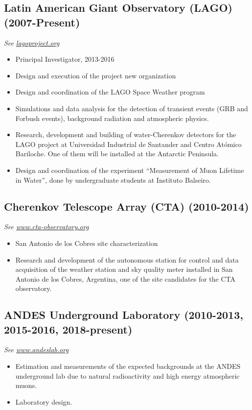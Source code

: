 \subsection*{Latin American Giant Observatory (LAGO) (2007-Present)}
{\small{\textit{See \href{http://lagoproject.org}{lagoproject.org}}}}
\begin{itemize}
\item Principal Investigator, 2013-2016
\item Design and execution of the project new organization
\item Design and coordination of the LAGO Space Weather program 
\item Simulations and data analysis for the detection of transient events
(GRB and Forbush events), background radiation and atmospheric physics.
\item Research, development and building of water-Cherenkov detectors for the
	LAGO project at Universidad Industrial de Santander and Centro Atómico
	Bariloche. One of them will be
installed at the Antarctic Peninsula.
\item Design and coordination of the experiment ``Measurement of Muon Lifetime in Water'', done by undergraduate students at Instituto Balseiro.
\end{itemize}

\subsection*{Cherenkov Telescope Array (CTA) (2010-2014)}
{\small{\textit{See \href{http://www.cta-observatory.org}{www.cta-observatory.org}}}}
\begin{itemize}
\item San Antonio de los Cobres site characterization
\item Research and development of the autonomous station for control and data
acquisition of the weather station and sky quality meter installed in San
Antonio de los Cobres, Argentina, one of the site candidates for the CTA
observatory.
\end{itemize}

\subsection*{ANDES Underground Laboratory (2010-2013, 2015-2016, 2018-present)}
{\small{\textit{See \href{http://www.andeslab.org}{www.andeslab.org}}}}
\begin{itemize}
\item Estimation and measurements of the expected backgrounds at the ANDES
underground lab due to natural radioactivity and high energy atmospheric muons.
\item Laboratory design.
\end{itemize}

